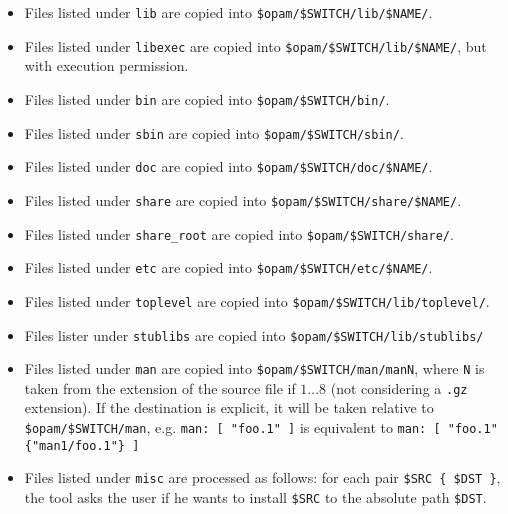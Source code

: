 \documentclass[a4paper,10pt]{article}
\begin{document}
\begin{itemize}
\item Files listed under {\tt lib} are copied into \verb+$opam/$SWITCH/lib/$NAME/+.
\item Files listed under {\tt libexec} are copied into \verb+$opam/$SWITCH/lib/$NAME/+, but with execution permission.
\item Files listed under {\tt bin} are copied into \verb+$opam/$SWITCH/bin/+.
\item Files listed under {\tt sbin} are copied into \verb+$opam/$SWITCH/sbin/+.
\item Files listed under {\tt doc} are copied into \verb+$opam/$SWITCH/doc/$NAME/+.
\item Files listed under {\tt share} are copied into \verb+$opam/$SWITCH/share/$NAME/+.
\item Files listed under {\tt share\_root} are copied into \verb+$opam/$SWITCH/share/+.
\item Files listed under {\tt etc} are copied into \verb+$opam/$SWITCH/etc/$NAME/+.
\item Files listed under {\tt toplevel} are copied into \verb+$opam/$SWITCH/lib/toplevel/+.
\item Files lister under {\tt stublibs} are copied into \verb+$opam/$SWITCH/lib/stublibs/+
\item Files listed under {\tt man} are copied into
  \verb+$opam/$SWITCH/man/manN+, where \verb+N+ is taken from the extension of
  the source file if $1\dots8$ (not considering a \verb+.gz+ extension). If the
  destination is explicit, it will be taken relative to
  \verb+$opam/$SWITCH/man+, e.g.
  \verb+man: [ "foo.1" ]+ is equivalent to \verb+man: [ "foo.1" {"man1/foo.1"} ]+
\item Files listed under {\tt misc} are processed as follows:
  for each pair \verb+$SRC { $DST }+, the tool asks the user if
  he wants to install \verb+$SRC+ to the absolute path \verb+$DST+.
\end{itemize}
\end{document}
